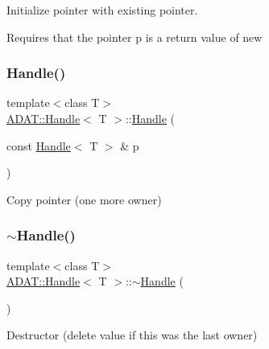 Initialize pointer with existing pointer. 

Requires that the pointer p is a return value of new \mbox{\label{classADAT_1_1Handle_af9529874ca6ca9db10dbbeeb0a776d84}} 
\subsubsection{\texorpdfstring{Handle()}{Handle()}\hspace{0.1cm}{\footnotesize\ttfamily [4/6]}}
{\footnotesize\ttfamily template$<$class T$>$ \\
\mbox{\hyperlink{classADAT_1_1Handle}{A\+D\+A\+T\+::\+Handle}}$<$ T $>$\+::\mbox{\hyperlink{classADAT_1_1Handle}{Handle}} (\begin{DoxyParamCaption}\item[{const \mbox{\hyperlink{classADAT_1_1Handle}{Handle}}$<$ T $>$ \&}]{p }\end{DoxyParamCaption})\hspace{0.3cm}{\ttfamily [inline]}}



Copy pointer (one more owner) 

\mbox{\label{classADAT_1_1Handle_a358ca2d3df9674e7ccb416574df96ce5}} 
\subsubsection{\texorpdfstring{$\sim$Handle()}{~Handle()}\hspace{0.1cm}{\footnotesize\ttfamily [2/3]}}
{\footnotesize\ttfamily template$<$class T$>$ \\
\mbox{\hyperlink{classADAT_1_1Handle}{A\+D\+A\+T\+::\+Handle}}$<$ T $>$\+::$\sim$\mbox{\hyperlink{classADAT_1_1Handle}{Handle}} (\begin{DoxyParamCaption}{ }\end{DoxyParamCaption})\hspace{0.3cm}{\ttfamily [inline]}}



Destructor (delete value if this was the last owner) 

